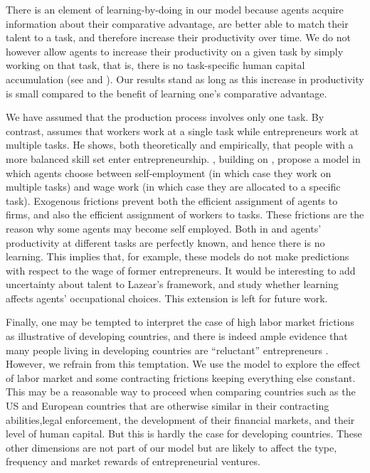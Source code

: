 \documentclass[12pt,american]{paper}
\theoremstyle{remark}
\begin{document}

There is an element of learning-by-doing in our model because agents acquire information about their comparative advantage, are better able to match their talent to a task, and therefore increase their productivity over time.  We do not however allow agents to increase their productivity on a given task by simply working on that task, that is, there is no task-specific human capital accumulation (see \citealp{gibbons1999theory} and \citealp{gibbons2004task}).
Our results stand as long as this increase in productivity is small compared to the benefit of learning one's comparative advantage.  
  

We have assumed that the production process involves only one task. By contrast, \citet{lazear2004balanced} assumes that workers work at a single task while entrepreneurs work at multiple tasks. He shows, both theoretically and empirically, that people with a more balanced skill set enter entrepreneurship. \citet*{aastebro2011stars}, building on \citet{lazear2004balanced}, propose a model in which agents choose between self-employment (in which case they work on multiple tasks) and wage work (in which case they are allocated to a specific task). Exogenous frictions prevent both the efficient assignment of agents to firms, and also the efficient assignment of workers to tasks. These frictions are the reason why some agents may become self employed. Both in \citet{lazear2004balanced}  and \citet{aastebro2011stars} agents' productivity at different tasks are perfectly known, and hence there is no learning. This implies that, for example, these models do not  make predictions with respect to the wage of former entrepreneurs.
It would be interesting to add uncertainty about talent to Lazear's framework, and study whether learning affects agents' occupational choices. This extension is left for future work. 

Finally, one may be tempted to interpret the case of high labor market frictions as illustrative of developing countries, and there is indeed ample evidence that many people living in developing countries are ``reluctant'' entrepreneurs  \citep{pooreconomics}. However, we refrain from this temptation. We use the model to explore the effect of labor market and some contracting frictions keeping everything else constant. This may be a reasonable way to proceed when comparing countries such as the US and European countries that are otherwise similar in their contracting abilities,legal enforcement, the development of their financial markets, and their level of human capital. But this is hardly the case for developing countries. These other dimensions are not part of our model but are likely to affect the type, frequency and market rewards of entrepreneurial ventures.
\end{document}
